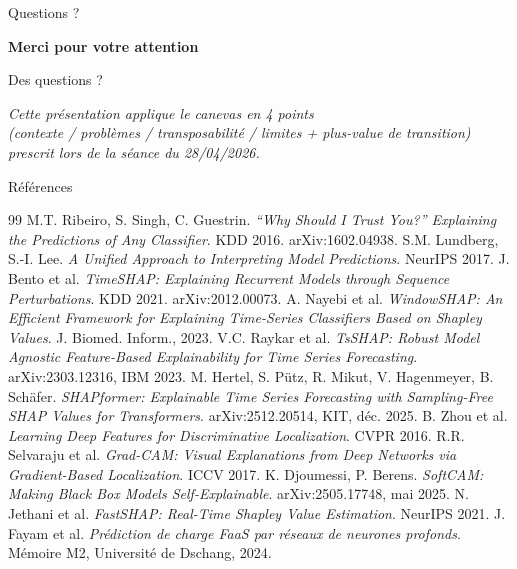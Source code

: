 \documentclass[10pt]{beamer}
\begin{document}
\begin{frame}{Questions ?}
  \vspace{20pt}
  \begin{center}
    \Large\textbf{Merci pour votre attention}

    \vspace{14pt}
    \large Des questions ?

    \vspace{14pt}
    {\footnotesize
    \emph{Cette présentation applique le canevas en 4 points\\
    (contexte / problèmes / transposabilité / limites + plus-value de transition)\\
    prescrit lors de la séance du 28/04/2026.}}
  \end{center}
\end{frame}

\begin{frame}[allowframebreaks]{Références}
  \scriptsize
  \begin{thebibliography}{99}
     M.T. Ribeiro, S. Singh, C. Guestrin.
      \emph{``Why Should I Trust You?'' Explaining the Predictions of Any Classifier}. KDD 2016. arXiv:1602.04938.
     S.M. Lundberg, S.-I. Lee.
      \emph{A Unified Approach to Interpreting Model Predictions}. NeurIPS 2017.
     J. Bento et al.
      \emph{TimeSHAP: Explaining Recurrent Models through Sequence Perturbations}. KDD 2021. arXiv:2012.00073.
     A. Nayebi et al.
      \emph{WindowSHAP: An Efficient Framework for Explaining Time-Series Classifiers Based on Shapley Values}. J. Biomed. Inform., 2023.
     V.C. Raykar et al.
      \emph{TsSHAP: Robust Model Agnostic Feature-Based Explainability for Time Series Forecasting}. arXiv:2303.12316, IBM 2023.
     M. Hertel, S. Pütz, R. Mikut, V. Hagenmeyer, B. Schäfer.
      \emph{SHAPformer: Explainable Time Series Forecasting with Sampling-Free SHAP Values for Transformers}. arXiv:2512.20514, KIT, déc. 2025.
     B. Zhou et al.
      \emph{Learning Deep Features for Discriminative Localization}. CVPR 2016.
     R.R. Selvaraju et al.
      \emph{Grad-CAM: Visual Explanations from Deep Networks via Gradient-Based Localization}. ICCV 2017.
     K. Djoumessi, P. Berens.
      \emph{SoftCAM: Making Black Box Models Self-Explainable}. arXiv:2505.17748, mai 2025.
     N. Jethani et al.
      \emph{FastSHAP: Real-Time Shapley Value Estimation}. NeurIPS 2021.
     J. Fayam et al.
      \emph{Prédiction de charge FaaS par réseaux de neurones profonds}. Mémoire M2, Université de Dschang, 2024.
  \end{thebibliography}
\end{frame}

\end{document}
